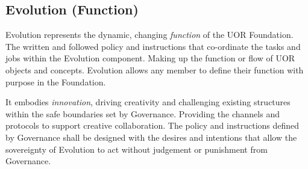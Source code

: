 \documentclass[twocolumn,10pt]{article}
\begin{document}
\subsection*{Evolution (Function)}
Evolution represents the dynamic, changing \textit{function} of the UOR Foundation.
The written and followed policy and instructions that co-ordinate the tasks and jobs within the Evolution component.
Making up the function or flow of UOR objects and concepts.
Evolution allows any member to define their function with purpose in the Foundation.

It embodies \textit{innovation}, driving creativity and challenging existing structures within the safe boundaries set by Governance.
Providing the channels and protocols to support creative collaboration.
The policy and instructions defined by Governance shall be designed with the desires and intentions that allow the sovereignty of Evolution to act without judgement or punishment from Governance.
\end{document}
